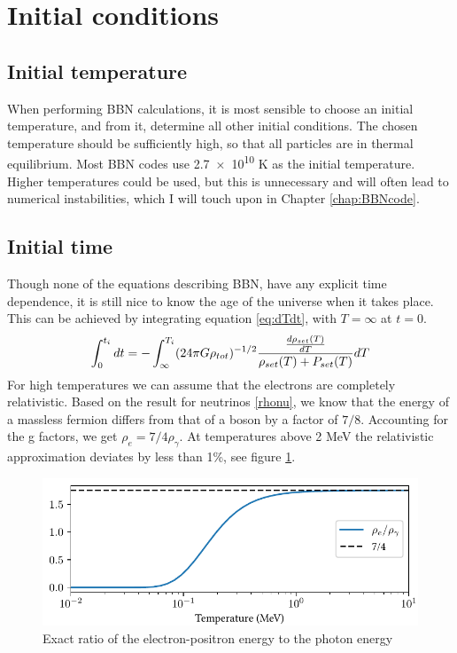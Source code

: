 
\section{Initial conditions}

\subsection{Initial temperature}
When performing BBN calculations, it is most sensible to choose an initial temperature, and from it, determine all other initial conditions. The chosen temperature should be sufficiently high, so that all particles are in thermal equilibrium. Most BBN codes use \num{2.7e10} K as the initial temperature. Higher temperatures could be used, but this is unnecessary and will often lead to numerical instabilities, which I will touch upon in Chapter \ref{chap:BBNcode}.

\subsection{Initial time}

Though none of the equations describing BBN, have any explicit time dependence, it is still nice to know the age of the universe when it takes place. This can be achieved by integrating equation \eqref{eq:dTdt}, with $T=\infty$ at $t=0$.
\begin{align}
    \int_{0}^{t_i}dt=-\int_{\infty}^{T_i}(24\pi G\rho_{tot})^{-1/2}\frac{\frac{d\rho_{set}(T)}{dT}}{\rho_{set}(T) + P_{set}(T)}dT
    \label{eq:ti_integral}
\end{align}
For high temperatures we can assume that the electrons are completely relativistic. Based on the result for neutrinos \eqref{rhonu}, we know that the energy of a massless fermion differs from that of a boson by a factor of $7/8$. Accounting for the g factors, we get $\rho_e=7/4 \rho_\gamma$. At temperatures above 2 MeV the relativistic approximation deviates by less than 1\%, see figure \ref{fig:rhoegammaT}.
\begin{figure}[h]
    \includegraphics[width=5.1in]{figures/rhoegammaT.pdf}
    \caption{Exact ratio of the electron-positron energy to the photon energy}
    \label{fig:rhoegammaT}
\end{figure}

